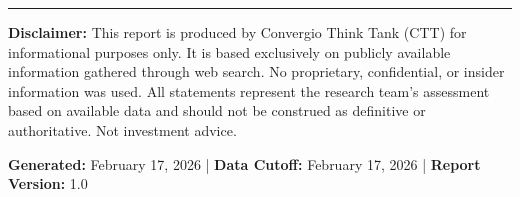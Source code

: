 \documentclass[11pt,a4paper]{article}
\begin{document}
\vfill
\hrule
\vspace{8pt}
{\scriptsize\color{msgray}
\textbf{Disclaimer:} This report is produced by Convergio Think Tank (CTT) for informational purposes only. It is based exclusively on publicly available information gathered through web search. No proprietary, confidential, or insider information was used. All statements represent the research team's assessment based on available data and should not be construed as definitive or authoritative. Not investment advice.

\textbf{Generated:} February 17, 2026 | \textbf{Data Cutoff:} February 17, 2026 | \textbf{Report Version:} 1.0
}
\end{document}
